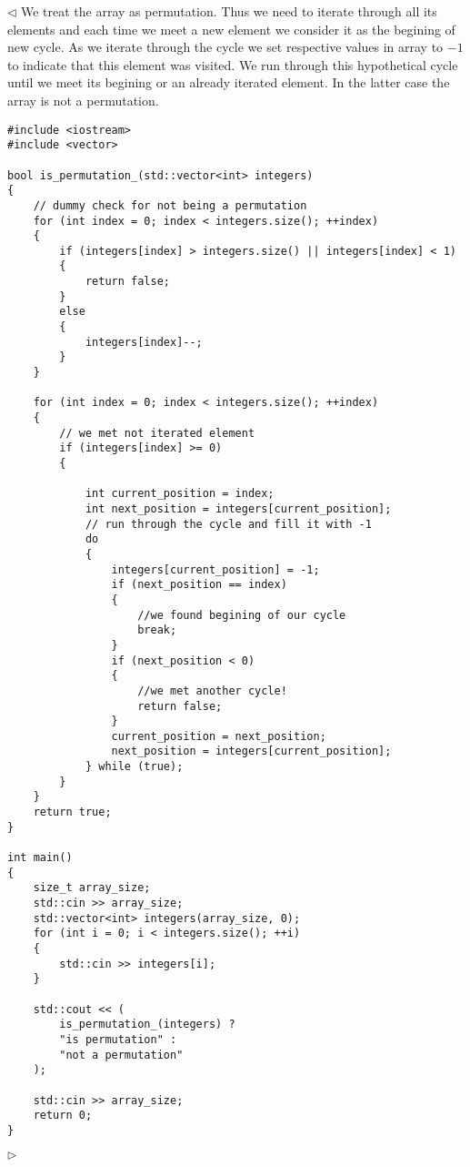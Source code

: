 \documentclass[12pt]{article}
\newenvironment{solution}{\par $\triangleleft$}{$\triangleright$}
\begin{document}
\begin{solution} We treat the array as permutation. Thus we need to iterate
    through all its elements and each time we meet a new element we consider it
    as the begining of new cycle. As we iterate through the cycle we set
    respective values in array to $-1$ to indicate that this element was
    visited. We run through this hypothetical cycle until we meet its begining
    or an already iterated element. In the latter case the array is not a
    permutation.

    \begin{verbatim}
#include <iostream>
#include <vector>

bool is_permutation_(std::vector<int> integers)
{
    // dummy check for not being a permutation
    for (int index = 0; index < integers.size(); ++index)
    {
        if (integers[index] > integers.size() || integers[index] < 1)
        {
            return false;
        }
        else
        {
            integers[index]--;
        }
    }

    for (int index = 0; index < integers.size(); ++index)
    {
        // we met not iterated element
        if (integers[index] >= 0)
        {

            int current_position = index;
            int next_position = integers[current_position];
            // run through the cycle and fill it with -1
            do
            {
                integers[current_position] = -1;
                if (next_position == index)
                {
                    //we found begining of our cycle
                    break;
                }
                if (next_position < 0)
                {
                    //we met another cycle!
                    return false;
                }
                current_position = next_position;
                next_position = integers[current_position];
            } while (true);
        }
    }
    return true;
}

int main()
{
    size_t array_size;
    std::cin >> array_size;
    std::vector<int> integers(array_size, 0);
    for (int i = 0; i < integers.size(); ++i)
    {
        std::cin >> integers[i];
    }

    std::cout << (
        is_permutation_(integers) ?
        "is permutation" :
        "not a permutation"
    );

    std::cin >> array_size;
    return 0;
}
\end{verbatim}
\end{solution}
\end{document}
